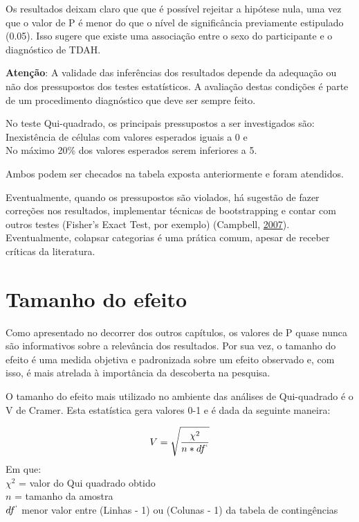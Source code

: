 \documentclass[
]{book}
\begin{document}
Os resultados deixam claro que que é possível rejeitar a hipótese nula,
uma vez que o valor de P é menor do que o nível de significância
previamente estipulado (0.05). Isso sugere que existe uma associação
entre o sexo do participante e o diagnóstico de TDAH.

\begin{warning}

\textbf{Atenção}: A validade das inferências dos resultados depende da
adequação ou não dos pressupostos dos testes estatísticos. A avaliação
destas condições é parte de um procedimento diagnóstico que deve ser
sempre feito.

\end{warning}

No teste Qui-quadrado, os principais pressupostos a ser investigados
são:\\
Inexistência de células com valores esperados iguais a 0 e\\
No máximo 20\% dos valores esperados serem inferiores a 5.

Ambos podem ser checados na tabela exposta anteriormente e foram
atendidos.

Eventualmente, quando os pressupostos são violados, há sugestão de fazer
correções nos resultados, implementar técnicas de bootstrapping e contar
com outros testes (Fisher's Exact Test, por exemplo) (Campbell,
\protect\hyperlink{ref-Campbell2007}{2007}). Eventualmente, colapsar
categorias é uma prática comum, apesar de receber críticas da
literatura.

\hypertarget{tamanho-do-efeito}{%
\section{Tamanho do efeito}\label{tamanho-do-efeito}}

Como apresentado no decorrer dos outros capítulos, os valores de P quase
nunca são informativos sobre a relevância dos resultados. Por sua vez, o
tamanho do efeito é uma medida objetiva e padronizada sobre um efeito
observado e, com isso, é mais atrelada à importância da descoberta na
pesquisa.

O tamanho do efeito mais utilizado no ambiente das análises de
Qui-quadrado é o V de Cramer. Esta estatística gera valores 0-1 e é dada
da seguinte maneira:

\[V=\sqrt\frac{\chi^2}{n*df^`}\] Em que:\\
\(\chi^2\) = valor do Qui quadrado obtido\\
\(n\) = tamanho da amostra\\
\(df^`\) menor valor entre (Linhas - 1) ou (Colunas - 1) da tabela de
contingências
\end{document}
